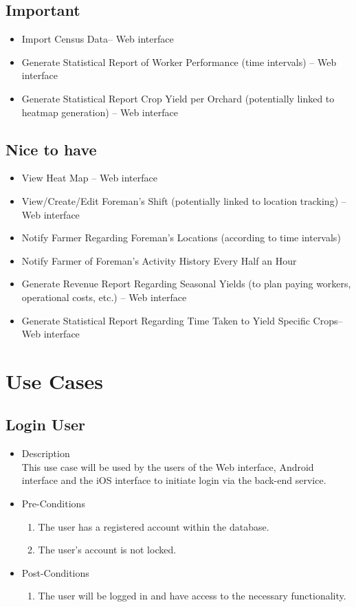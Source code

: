 \documentclass[11pt,fleqn]{book} %
\begin{document}
	\subsection{Important}
	\begin{itemize}
		\item Import Census Data– Web interface
		\item Generate Statistical Report of Worker Performance (time intervals) – Web interface
		\item Generate Statistical Report Crop Yield per Orchard (potentially linked to heatmap generation) – Web interface				
	\end{itemize}		
	
	\subsection{Nice to have}
	\begin{itemize}
		\item View Heat Map – Web interface
		\item View/Create/Edit Foreman’s Shift (potentially linked to location tracking)  – Web interface
		\item Notify Farmer Regarding Foreman’s Locations (according to time intervals)
		\item Notify Farmer of Foreman’s Activity History Every Half an Hour
		\item Generate Revenue Report Regarding Seasonal Yields (to plan paying workers, operational costs, etc.) – Web interface
		\item Generate Statistical Report Regarding Time Taken to Yield Specific Crops– Web interface
		
	\end{itemize}
	\section{Use Cases}
	\subsection{Login User}
	\begin{itemize}
		\item Description\\
		This use case will be used by the users of the Web interface, Android interface and the iOS interface to initiate login via the back-end service.
		\item Pre-Conditions
		\begin{enumerate}
			\item The user has a registered account within the database.
			\item The user’s account is not locked.
		\end{enumerate}
		\item Post-Conditions
		\begin{enumerate}
			\item The user will be logged in and have access to the necessary functionality.
		\end{enumerate}
	\end{itemize}
	
\end{document}
